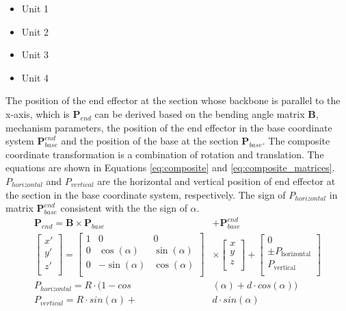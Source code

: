 \begin{itemize}
    \item Unit 1
    \item Unit 2
    \item Unit 3
    \item Unit 4
\end{itemize}

The position of the end effector at the section whose backbone is parallel to the x-axis, which is $\textbf{P}_{end}$ can be 
derived based on the bending angle matrix $\textbf{B}$, mechanism parameters, the position of the end effector in the base 
coordinate system $\textbf{P}_{base}^{end}$ and the position of the base at the section $\textbf{P}_{base}$. The composite 
coordinate transformation is a combination of rotation and translation. The equations are shown in Equations \ref{eq:composite} 
and \ref{eq:composite_matrices}. $P_{horizontal}$ and $P_{vertical}$ are the horizontal and vertical position of end effector 
at the section in the base coordinate system, respectively. The sign of $P_{horizontal}$ in matrix $\textbf{P}_{base}^{end}$ 
consistent with the the sign of $\alpha$.
\begin{align}
    \textbf{P}_{end} = \textbf{B} \times \textbf{P}_{base} &+ \textbf{P}_{base}^{end} \label{eq:composite} \\
    \begin{bmatrix}
        x' \\
        y' \\
        z' \\
    \end{bmatrix}
    =
    \begin{bmatrix}
        1 & 0 & 0 \\
        0 & \cos(\alpha) & \sin(\alpha) \\
        0 & -\sin(\alpha) & \cos(\alpha) \\
    \end{bmatrix}
    &\times
    \begin{bmatrix}
        x \\
        y \\
        z \\
    \end{bmatrix}
    +
    \begin{bmatrix}
        0 \\
        \pm P_{\text{horizontal}} \\
        P_{\text{vertical}} \\
    \end{bmatrix}\label{eq:composite_matrices} \\
    P_{horizontal} = R\cdot(1-cos&(\alpha) + d\cdot cos(\alpha)) \nonumber \\ 
    P_{vertical} = R\cdot sin(\alpha) + &d\cdot sin(\alpha) \nonumber
\end{align}
